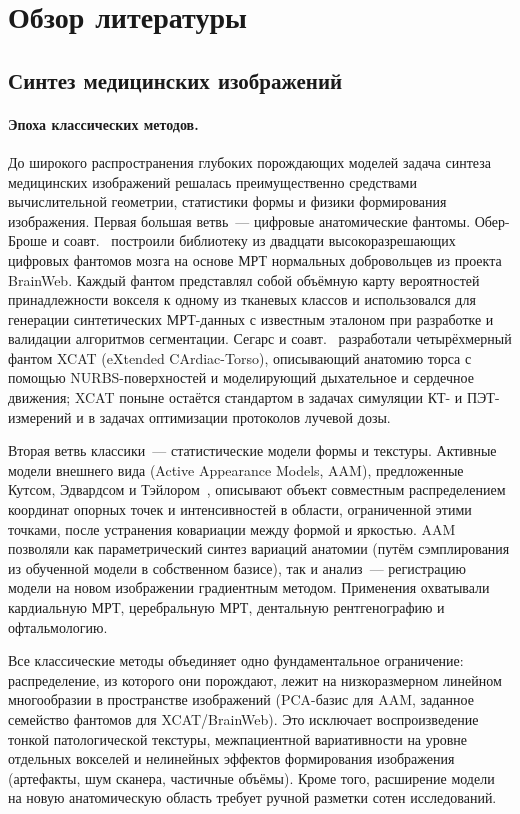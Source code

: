 \section{Обзор литературы}
\label{sec:related}

\subsection{Синтез медицинских изображений}

\paragraph{Эпоха классических методов.}
До широкого распространения глубоких порождающих моделей задача синтеза медицинских изображений решалась преимущественно средствами вычислительной геометрии, статистики формы и физики формирования изображения. Первая большая ветвь~--- цифровые анатомические фантомы. Обер-Броше и соавт.~\cite{aubert2006twenty} построили библиотеку из двадцати высокоразрешающих цифровых фантомов мозга на основе МРТ нормальных добровольцев из проекта BrainWeb. Каждый фантом представлял собой объёмную карту вероятностей принадлежности вокселя к одному из тканевых классов и использовался для генерации синтетических МРТ-данных с известным эталоном при разработке и валидации алгоритмов сегментации. Сегарс и соавт.~\cite{segars20104d} разработали четырёхмерный фантом XCAT (eXtended CArdiac-Torso), описывающий анатомию торса с помощью NURBS-поверхностей и моделирующий дыхательное и сердечное движения; XCAT поныне остаётся стандартом в задачах симуляции КТ- и ПЭТ-измерений и в задачах оптимизации протоколов лучевой дозы.

Вторая ветвь классики~--- статистические модели формы и текстуры. Активные модели внешнего вида (Active Appearance Models, AAM), предложенные Кутсом, Эдвардсом и Тэйлором~\cite{927467}, описывают объект совместным распределением координат опорных точек и интенсивностей в области, ограниченной этими точками, после устранения ковариации между формой и яркостью. AAM позволяли как параметрический синтез вариаций анатомии (путём сэмплирования из обученной модели в собственном базисе), так и анализ~--- регистрацию модели на новом изображении градиентным методом. Применения охватывали кардиальную МРТ, церебральную МРТ, дентальную рентгенографию и офтальмологию.

Все классические методы объединяет одно фундаментальное ограничение: распределение, из которого они порождают, лежит на низкоразмерном линейном многообразии в пространстве изображений (PCA-базис для AAM, заданное семейство фантомов для XCAT/BrainWeb). Это исключает воспроизведение тонкой патологической текстуры, межпациентной вариативности на уровне отдельных вокселей и нелинейных эффектов формирования изображения (артефакты, шум сканера, частичные объёмы). Кроме того, расширение модели на новую анатомическую область требует ручной разметки сотен исследований.

